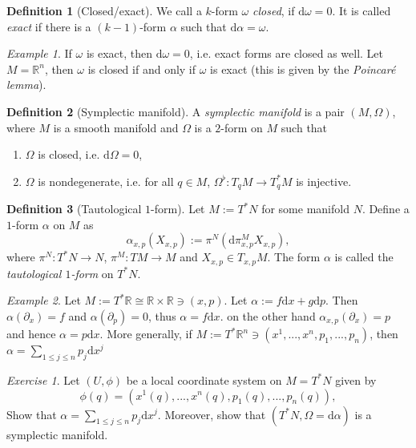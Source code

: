 \documentclass[12pt]{amsart}
\numberwithin{equation}{section}
\theoremstyle{plain}
\theoremstyle{definition}
\newtheorem{defn}{Definition}[subsection]
\theoremstyle{remark}
\newtheorem{exe}{Exercise}[subsection]
\newtheorem{ex}{Example}[subsection]
\newcommand{\R}{\mathbb{R}}
\newcommand{\dd}{{\mathrm{d}}}
\begin{document}
\begin{defn}[Closed/exact]
We call a $k$-form $\omega$ \emph{closed}, if $\dd\omega=0$. It is called \emph{exact} if there is a $(k-1)$-form $\alpha$ such that $\dd\alpha=\omega$.
\end{defn}

\begin{ex}
If $\omega$ is exact, then $\dd\omega=0$, i.e. exact forms are closed as well. Let $M=\R^n$, then $\omega$ is closed if and only if $\omega$ is exact (this is given by the \emph{Poincar\'e lemma}).
\end{ex}


\begin{defn}[Symplectic manifold]
A \emph{symplectic manifold} is a pair $(M,\Omega)$, where $M$ is a smooth manifold and $\Omega$ is a $2$-form on $M$ such that
\begin{enumerate}
\item{$\Omega$ is closed, i.e. $\dd\Omega=0$,}
\item{$\Omega$ is nondegenerate, i.e. for all $q\in M$, $\Omega^\flat\colon T_qM\to T_q^*M$ is injective.}
\end{enumerate}
\end{defn}

\begin{defn}[Tautological $1$-form]
Let $M:=T^*N$ for some manifold $N$. Define a $1$-form $\alpha$ on $M$ as 
$$\alpha_{x,p}(X_{x,p}):=\pi^N(\dd \pi^M_{x,p}X_{x,p}),$$
where $\pi^N\colon T^*N\to N$, $\pi^M\colon TM\to M$ and $X_{x,p}\in T_{x,p}M$. The form $\alpha$ is called the \emph{tautological $1$-form} on $T^*N$.
\end{defn}

\begin{ex}
Let $M:=T^*\R\cong \R\times \R\ni(x,p)$. Let $\alpha:=f\dd x+g\dd p$. Then $\alpha(\partial_x)=f$ and $\alpha(\partial_p)=0$, thus $\alpha=f\dd x$. on the other hand $\alpha_{x,p}(\partial_x)=p$ and hence $\alpha=p\dd x$. More generally, if $M:=T^*\R^n\ni(x^{1},...,x^n,p_1,...,p_n)$, then $\alpha=\sum_{1\leq j\leq n}p_j\dd x^j$
\end{ex}

\begin{exe}
Let $(U,\phi)$ be a local coordinate system on $M=T^*N$ given by $$\phi(q)=(x^1(q),...,x^n(q),p_1(q),...,p_n(q)),$$ Show that $\alpha=\sum_{1\leq j\leq n}p_j\dd x^j$. Moreover, show that $(T^*N,\Omega=\dd\alpha)$ is a symplectic manifold.
\end{exe}
\end{document}
